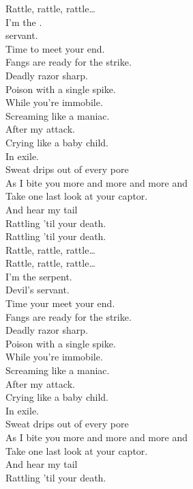 Rattle, rattle, rattle… \\

I'm the . \\
 servant. \\
Time to meet your end. \\

Fangs are ready for the strike. \\
Deadly razor sharp. \\
Poison with a single spike. \\
While you're immobile. \\

Screaming like a maniac. \\
After my attack. \\
Crying like a baby child. \\
In exile. \\

Sweat drips out of every pore \\
As I bite you more and more and more and \\
Take one last look at your captor. \\
And hear my tail \\
Rattling 'til your death. \\

Rattling 'til your death. \\

Rattle, rattle, rattle… \\

Rattle, rattle, rattle… \\

I'm the serpent. \\
Devil's servant. \\
Time your meet your end. \\

Fangs are ready for the strike. \\
Deadly razor sharp. \\
Poison with a single spike. \\
While you're immobile. \\

Screaming like a maniac. \\
After my attack. \\
Crying like a baby child. \\
In exile. \\

Sweat drips out of every pore \\
As I bite you more and more and more and \\
Take one last look at your captor. \\
And hear my tail \\
Rattling 'til your death. \\ \\

